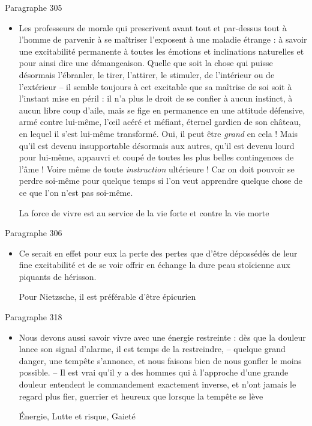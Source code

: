 \documentclass[french,a4paper,11pt,answers]{exam}
\newcommand{\cit}[2]{\og #1 \fg{} \begin{solution}{ #2 }\end{solution}} %
\begin{document}
	\begin{cadre}{Paragraphe 305}
		\begin{itemize}
			\item \cit{Les professeurs de morale qui prescrivent avant tout et par-dessus tout à l’homme de parvenir à se maîtriser l’exposent à une maladie étrange : à savoir une excitabilité permanente à toutes les émotions et inclinations naturelles et pour ainsi dire une démangeaison. Quelle que soit la chose qui puisse désormais l’ébranler, le tirer, l’attirer, le stimuler, de l’intérieur ou de l’extérieur – il semble toujours à cet excitable que sa maîtrise de soi soit à l’instant mise en péril : il n’a plus le droit de se confier à aucun instinct, à aucun libre coup d’aile, mais se fige en permanence en une attitude défensive, armé contre lui-même, l’œil acéré et méfiant, éternel gardien de son château, en lequel il s’est lui-même transformé. Oui, il peut être \emph{grand} en cela ! Mais qu’il est devenu insupportable désormais aux autres, qu’il est devenu lourd pour lui-même, appauvri et coupé de toutes les plus belles contingences de l’âme ! Voire même de toute \emph{instruction} ultérieure ! Car on doit pouvoir se perdre soi-même pour quelque temps si l’on veut apprendre quelque chose de ce que l’on n’est pas soi-même.}
				{La force de vivre est au service de la vie forte et contre la vie morte} %
		\end{itemize}
	\end{cadre}
	
	\begin{cadre}{Paragraphe 306}
		\begin{itemize}
			\item \cit{Ce serait en effet pour eux la perte des pertes que d'être dépossédés de leur fine excitabilité et de se voir offrir en échange la dure peau stoïcienne aux piquants de hérisson.}
				{Pour Nietzsche, il est préférable d'être épicurien}
		\end{itemize}
	\end{cadre}
	
	\begin{cadre}{Paragraphe 318}
		\begin{itemize}
			\item \cit{Nous devons aussi savoir vivre avec une énergie restreinte : dès que la douleur lance son signal d'alarme, il est temps de la restreindre, -- quelque grand danger, une tempête s'annonce, et nous faisons bien de nous \og gonfler \fg{} le moins possible. -- Il est vrai qu'il y a des hommes qui à l'approche d'une grande douleur entendent le commandement exactement inverse, et n'ont jamais le regard plus fier, guerrier et heureux que lorsque la tempête se lève}
				{Énergie, Lutte et risque, Gaieté}
		\end{itemize}
	\end{cadre}
\end{document}
